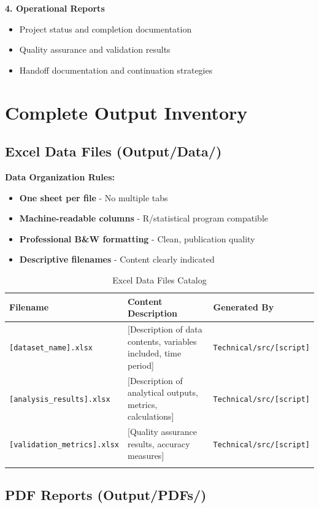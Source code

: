 \documentclass[11pt,letterpaper]{article}
\begin{document}
\textbf{4. Operational Reports}
\begin{itemize}
    \item Project status and completion documentation
    \item Quality assurance and validation results
    \item Handoff documentation and continuation strategies
\end{itemize}

\section{Complete Output Inventory}

\subsection{Excel Data Files (Output/Data/)}

\textbf{Data Organization Rules:}
\begin{itemize}
    \item \textbf{One sheet per file} - No multiple tabs
    \item \textbf{Machine-readable columns} - R/statistical program compatible
    \item \textbf{Professional B\&W formatting} - Clean, publication quality
    \item \textbf{Descriptive filenames} - Content clearly indicated
\end{itemize}

\begin{longtable}{@{}p{4cm}p{6cm}p{4cm}@{}}
\toprule
\textbf{Filename} & \textbf{Content Description} & \textbf{Generated By} \\
\midrule
\endhead
\texttt{[dataset\_name].xlsx} & [Description of data contents, variables included, time period] & \texttt{Technical/src/[script]} \\
\texttt{[analysis\_results].xlsx} & [Description of analytical outputs, metrics, calculations] & \texttt{Technical/src/[script]} \\
\texttt{[validation\_metrics].xlsx} & [Quality assurance results, accuracy measures] & \texttt{Technical/src/[script]} \\
\bottomrule
\caption{Excel Data Files Catalog}
\end{longtable}

\subsection{PDF Reports (Output/PDFs/)}
\end{document}
